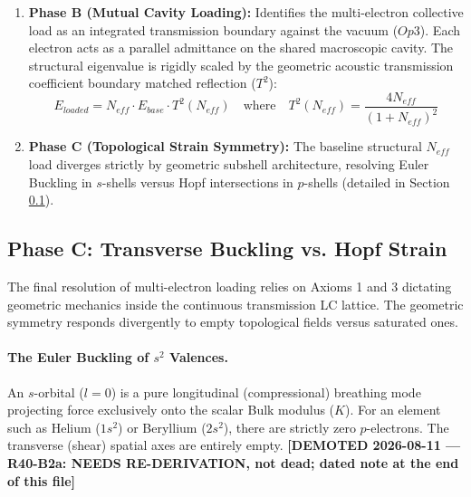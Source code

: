 \begin{enumerate}
\begin{resultbox}{Deterministic Break of $l$-Degeneracy (Lithium $Z=3$)}
The active ODE solver derives the exact structural break identically without QM abstractions:
\begin{itemize}
    \item $2s$ State ($l=0$ penetrating): $E_{bind} = 5.75$ eV
    \item $2p$ State ($l=1$ core-blocked): $E_{bind} = 13.26$ eV
\end{itemize}
The $2p$ state remains locked tightly to the ideal nested boundary, while the cross-shell penetration acts as a massive shunt admittance natively scattering the $2s$ mode away to realistically match its $\approx 5.39$ eV experimental baseline.
\end{resultbox}
    \item \textbf{Phase B (Mutual Cavity Loading):} Identifies the multi-electron collective load as an integrated transmission boundary against the vacuum ($Op3$). Each electron acts as a parallel admittance on the shared macroscopic cavity. The structural eigenvalue is rigidly scaled by the geometric acoustic transmission coefficient boundary matched reflection ($T^2$):
    $$ E_{loaded} = N_{eff} \cdot E_{base} \cdot T^2(N_{eff}) \quad \text{where} \quad T^2(N_{eff}) = \frac{4N_{eff}}{(1+N_{eff})^2} $$
    \item \textbf{Phase C (Topological Strain Symmetry):} The baseline structural $N_{eff}$ load diverges strictly by geometric subshell architecture, resolving Euler Buckling in $s$-shells versus Hopf intersections in $p$-shells (detailed in Section \ref{sec:topological_buckling_vs_hopf}).
\end{enumerate}

\subsection{Phase C: Transverse Buckling vs. Hopf Strain}
\label{sec:topological_buckling_vs_hopf}
The final resolution of multi-electron loading relies on Axioms 1 and 3 dictating geometric mechanics inside the continuous transmission LC lattice. The geometric symmetry responds divergently to empty topological fields versus saturated ones.

\paragraph{The Euler Buckling of $s^2$ Valences.}
An $s$-orbital ($l=0$) is a pure longitudinal (compressional) breathing mode projecting force exclusively onto the scalar Bulk modulus ($K$). For an element such as Helium ($1s^2$) or Beryllium ($2s^2$), there are strictly zero $p$-electrons. The transverse (shear) spatial axes are entirely empty. \textbf{[DEMOTED 2026-08-11 --- R40-B2a: NEEDS RE-DERIVATION, not dead; dated note at the end of this file]}

